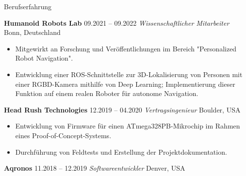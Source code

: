 \begin{rubric}{Berufserfahrung}

%
%
\entry*[] \textbf{Humanoid Robots Lab} \hfill 09.2021 -- 09.2022 \newline  
 \emph{Wissenschaftlicher Mitarbeiter} \hfill Bonn, Deutschland \newline  
\vspace{\CVItemizeHeaderSpacing} \begin{itemize}[leftmargin=*, rightmargin=1cm]
	\setlength{\itemsep}{\CVItemizeSpacing}  
	\item Mitgewirkt an Forschung und Veröffentlichungen im Bereich "Personalized Robot Navigation".  
	\item Entwicklung einer ROS-Schnittstelle zur 3D-Lokalisierung von Personen mit einer RGBD-Kamera mithilfe von Deep Learning; Implementierung dieser Funktion auf einem realen Roboter für autonome Navigation. 
\end{itemize}
%
%
\entry*[] \textbf{Head Rush Technologies} \hfill 12.2019 -- 04.2020 \newline  
 \emph{Vertragsingenieur} \hfill Boulder, USA \newline  
\vspace{\CVItemizeHeaderSpacing} \begin{itemize}[leftmargin=*, rightmargin=1cm]
	\setlength{\itemsep}{\CVItemizeSpacing}  
	\item Entwicklung von Firmware für einen ATmega328PB-Mikrochip im Rahmen eines Proof-of-Concept-Systems.
	\item Durchführung von Feldtests und Erstellung der Projektdokumentation.  
\end{itemize}
%
%
\entry*[] \textbf{Aqronos} \hfill 11.2018 -- 12.2019 \newline  
\emph{Softwareentwickler} \hfill Denver, USA \newline  

\end{rubric}
